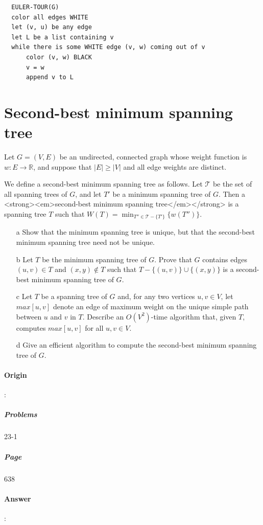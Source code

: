 \documentclass{article}
\begin{document}
\begin{lstlisting}
  EULER-TOUR(G)
  color all edges WHITE
  let (v, u) be any edge
  let L be a list containing v
  while there is some WHITE edge (v, w) coming out of v
      color (v, w) BLACK
      v = w
      append v to L
\end{lstlisting}

\section{Second-best minimum spanning tree}

Let $G = (V, E)$ be an undirected, connected graph whose weight function is $w: E \rightarrow \mathbb{R} $, and suppose that $|E| \ge |V|$ and all edge weights are distinct.

We define a second-best minimum spanning tree as follows. Let $\mathcal T$ be the set of all spanning trees of $G$, and let $T'$ be a minimum spanning tree of $G$. Then a <strong><em>second-best minimum spanning tree</em></strong> is a spanning tree $T$ such that $W(T) = \min_{T'' \in \mathcal T - \{T'\}} \{w(T'')\}$.

\begin{enumerate}
  \item[a] Show that the minimum spanning tree is unique, but that the second-best minimum spanning tree need not be unique.
  \item[b] Let $T$ be the minimum spanning tree of $G$. Prove that $G$ contains edges $(u, v) \in T$ and $(x, y) \notin T$ such that $T - \{(u, v)\} \cup \{(x, y)\}$ is a second-best minimum spanning tree of $G$.
  \item[c] Let $T$ be a spanning tree of $G$ and, for any two vertices $u, v \in V$, let $max[u, v]$ denote an edge of maximum weight on the unique simple path between $u$ and $v$ in $T$. Describe an $O(V^2)$-time algorithm that, given $T$, computes $max[u, v]$ for all $u, v \in V$.
  \item[d] Give an efficient algorithm to compute the second-best minimum spanning tree of $G$.
\end{enumerate}

\paragraph{Origin}:
  \subparagraph{Problems}23-1
  \subparagraph{Page}638
\paragraph{Answer}:
\end{document}

